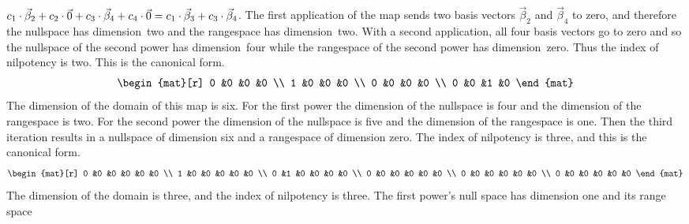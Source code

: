 \begin{exercises}
\begin{answer}
\begin{exparts}
          $c_1\cdot \vec{\beta}_2+c_2\cdot \vec{0}
            +c_3\cdot \vec{\beta}_4+c_4\cdot \vec{0}
           =c_1\cdot \vec{\beta}_3+c_3\cdot\vec{\beta}_4$.
          The first application of the map
          sends two basis vectors $\vec{\beta}_2$ and
          $\vec{\beta}_4$ to zero,
          and therefore the nullspace has dimension~two and the rangespace
          has dimension~two.
          With a second application, all four basis vectors go to
          zero and so the nullspace of the second power has dimension~four
          while the rangespace of the second power has dimension~zero.
          Thus the index of nilpotency is two.
          This is the canonical form.
          \begin{equation*}
            \begin{mat}[r]
              0  &0  &0  &0  \\
              1  &0  &0  &0  \\
              0  &0  &0  &0  \\
              0  &0  &1  &0
            \end{mat}
          \end{equation*}
        \partsitem The dimension of the domain of this map is six.
          For the first power the dimension of the nullspace is four
          and the dimension of the rangespace is two.
          For the second power the dimension of the nullspace is five
          and the dimension of the rangespace is one.
          Then the third iteration results in a nullspace of dimension
          six and a rangespace of dimension zero.
          The index of nilpotency is three, and this is the
          canonical form.
          \begin{equation*}
            \begin{mat}[r]
              0  &0  &0  &0  &0  &0  \\
              1  &0  &0  &0  &0  &0  \\
              0  &1  &0  &0  &0  &0  \\
              0  &0  &0  &0  &0  &0  \\              
              0  &0  &0  &0  &0  &0  \\              
              0  &0  &0  &0  &0  &0  
            \end{mat}
          \end{equation*}
        \partsitem The dimension of the domain is three, and the index of 
          nilpotency is three.
          The first power's null space has dimension one and its range space

\end{exparts}
\end{answer}
\end{exercises}
